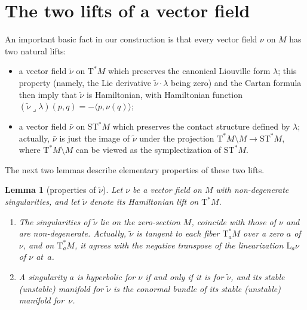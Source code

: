 \documentclass[JEP,XML,SOM,Unicode]{cedram}
\newenvironment{enumeratea}
{\bgroup\def\theenumi{\alph{enumi}}\begin{enumerate}}
{\end{enumerate}\egroup}
\newcommand{\tu}[1]{\textup{#1}}
\newcommand{\sT}{\mathrm{T}^\ast}
\newcommand{\sST}{\mathrm{ST}^\ast}
\newcommand{\hnu}{\tilde\nu}
\newcommand{\cnu}{\bar\nu}
\def\Lnu_#1{{\mathrm L_#1\nu}}
\newcommand{\prg}[1]{\langle #1 \rangle}
\newcommand{\hook}{\mathbin{\lrcorner}}
\theoremstyle{plain}
\newtheorem{lemma}[theorem]{Lemma}
\theoremstyle{definition}
\begin{document}
\section{The two lifts of a vector field} \label{s:lifts}

An important basic fact in our construction is that every vector field $\nu$ on
$M$ has two natural lifts:
\begin{itemize}
\item
a vector field $\hnu$ on $\sT M$ which preserves the canonical Liouville form
$\lambda$; this property (namely, the Lie derivative $\hnu \cdot \lambda$ being
zero) and the Cartan formula then imply that $\hnu$ is Hamiltonian, with
Hamiltonian function $(\hnu \hook \lambda)(p,q) = - \prg{p, \nu(q)}$;
\item
a vector field $\cnu$ on $\sST M$ which preserves the contact structure defined
by $\lambda$; actually, $\cnu$ is just the image of $\hnu$ under the projection
$\sT M \setminus M \to \sST M$, where $\sT M \setminus M$ can be viewed as the symplectization
of $\sST M$.
\end{itemize}
The next two lemmas describe elementary properties of these two lifts.

\begin{lemma}[properties of $\hnu$] \label{l:hnu}
Let $\nu$ be a vector field on $M$ with non-degenerate singularities, and let
$\hnu$ denote its Hamiltonian lift on $\sT M$.
\begin{enumeratea}
\item\label{l:hnua}
The singularities of $\hnu$ lie on the zero-section $M$, coincide with those of
$\nu$ and are non-degenerate. Actually, $\hnu$ is tangent to each fiber $\sT_aM$
over a zero $a$ of $\nu$, and on $\sT_aM$, it agrees with the negative transpose
of the linearization $\Lnu_a$ of $\nu$ at~$a$.

\item\label{l:hnub}
A singularity $a$ is hyperbolic for $\nu$ if and only if it is for $\hnu$, and
its stable \tu(\resp unstable\tu) manifold for $\hnu$ is the conormal bundle of
its stable \tu(\resp unstable\tu) manifold for~$\nu$.
\end{enumeratea}
\end{lemma}
\end{document}
